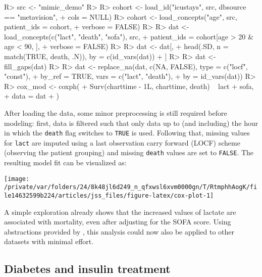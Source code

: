 \documentclass[
  notitle,
  nojss,
  noheadings]{jss}
\begin{document}
\begin{CodeChunk}
\begin{CodeInput}
R> src <- "mimic_demo"
R> 
R> cohort <- load_id("icustays", src, dbsource == "metavision",
+                   cols = NULL)
R> cohort <- load_concepts("age", src, patient_ids = cohort,
+                         verbose = FALSE)
R> 
R> dat <- load_concepts(c("lact", "death", "sofa"), src,
+                      patient_ids = cohort[age > 20 & age < 90, ],
+                      verbose = FALSE)
R> 
R> dat <- dat[,
+   head(.SD, n = match(TRUE, death, .N)), by = c(id_vars(dat))
+ ]
R> 
R> dat <- fill_gaps(dat)
R> 
R> dat <- replace_na(dat, c(NA, FALSE), type = c("locf", "const"),
+                   by_ref = TRUE, vars = c("lact", "death"),
+                   by = id_vars(dat))
R> 
R> cox_mod <- coxph(
+   Surv(charttime - 1L, charttime, death) ~ lact + sofa,
+   data = dat
+ )
\end{CodeInput}
\end{CodeChunk}

After loading the data, some minor preprocessing is still required
before modeling: first, data is filtered such that only data up to (and
including) the hour in which the \texttt{death} flag switches to
\texttt{TRUE} is used. Following that, missing values for \texttt{lact}
are imputed using a last observation carry forward (LOCF) scheme
(observing the patient grouping) and missing \texttt{death} values are
set to \texttt{FALSE}. The resulting model fit can be visualized as:

\begin{CodeChunk}


\begin{center}\texttt{[image: /private/var/folders/24/8k48jl6d249\_n\_qfxwsl6xvm0000gn/T/RtmphhAogK/file14632599b224/articles/jss\_files/figure-latex/cox-plot-1]} \end{center}

\end{CodeChunk}

A simple exploration already shows that the increased values of lactate
are associated with mortality, even after adjusting for the SOFA score.
Using abstractions provided by , this analysis could now also
be applied to other datasets with minimal effort.

\hypertarget{diabetes-and-insulin-treatment}{%
\subsection{Diabetes and insulin
treatment}\label{diabetes-and-insulin-treatment}}
\end{document}
